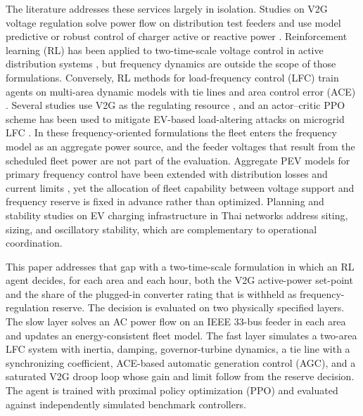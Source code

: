 The literature addresses these services largely in isolation. Studies
on V2G voltage regulation solve power flow on distribution test feeders
and use model predictive or robust control of charger active or
reactive power \cite{AmamraMarco2019,HuEtAl2022,AnEtAl2024,YuanEtAl2026}.
Reinforcement learning (RL) has been applied to two-time-scale voltage
control in active distribution systems \cite{Cao2022}, but frequency
dynamics are outside the scope of those formulations. Conversely, RL
methods for load-frequency control (LFC) train agents on multi-area
dynamic models with tie lines and area control error (ACE)
\cite{YanXu2020,Abouheaf2019,MaHuSong2024,ZhaoLiuHill2025,Wu2024Symmetry}.
Several studies use V2G as the regulating resource
\cite{Alfaverh2023,Liang2026Symmetry,Xiong2026Symmetry}, and an
actor--critic PPO scheme has been used to mitigate EV-based
load-altering attacks on microgrid LFC \cite{AbazariEtAl2025}.
In these frequency-oriented formulations the fleet enters the
frequency model as an aggregate power source, and the feeder voltages
that result from the scheduled fleet power are not part of the
evaluation. Aggregate
PEV models for primary frequency control have been extended with
distribution losses and current limits \cite{Izadkhast2015,Izadkhast2016},
yet the allocation of fleet capability between voltage support and
frequency reserve is fixed in advance rather than optimized. Planning
and stability studies on EV charging infrastructure in Thai networks
\cite{YenchamchalitEtAl2018PSO,YenchamchalitEtAl2021LFO,Yenchamchalit2021,
Kongjeen2019,Nuamkoksung2025} address siting, sizing, and oscillatory
stability, which are complementary to operational coordination.

This paper addresses that gap with a two-time-scale formulation in
which an RL agent decides, for each area and each hour, both the V2G
active-power set-point and the share of the plugged-in converter
rating that is withheld as frequency-regulation reserve. The decision
is evaluated on two physically specified layers. The slow layer solves
an AC power flow on an IEEE 33-bus feeder \cite{BaranWu1989} in each
area and updates an energy-consistent fleet model. The fast layer
simulates a two-area LFC system with inertia, damping,
governor-turbine dynamics, a tie line with a synchronizing coefficient,
ACE-based automatic generation control (AGC), and a saturated V2G droop
loop whose gain and limit follow from the reserve decision. The agent
is trained with proximal policy optimization (PPO) \cite{Schulman2017}
and evaluated against independently simulated benchmark controllers.


